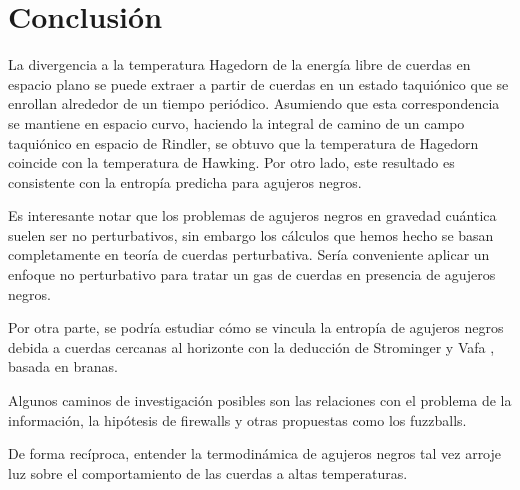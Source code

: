 \chapter{Conclusión}

La divergencia a la temperatura Hagedorn de la energía libre de cuerdas en espacio plano
se puede extraer a partir de cuerdas en un estado taquiónico que se enrollan alrededor de
un tiempo periódico.
Asumiendo que esta correspondencia se mantiene en espacio curvo, haciendo la integral 
de camino de un campo taquiónico en espacio de Rindler, se obtuvo que la temperatura de Hagedorn
coincide con la temperatura de Hawking.
Por otro lado, este resultado es consistente con la entropía predicha para agujeros negros.

Es interesante notar que los problemas de agujeros negros en gravedad cuántica suelen ser
no perturbativos, sin embargo los cálculos que hemos hecho se basan completamente en teoría de 
cuerdas perturbativa.
Sería conveniente aplicar un enfoque no perturbativo para tratar un gas de cuerdas en presencia de agujeros negros.

Por otra parte, se podría estudiar cómo se vincula la entropía de agujeros negros debida a cuerdas cercanas al horizonte con la deducción 
de Strominger y Vafa \cite{Strominger}, basada en branas.

Algunos caminos de investigación posibles son las relaciones con el problema de la información, la hipótesis de firewalls y
otras propuestas como los fuzzballs.

De forma recíproca, entender la termodinámica de agujeros negros tal vez arroje luz sobre el 
comportamiento de las cuerdas a altas temperaturas.

